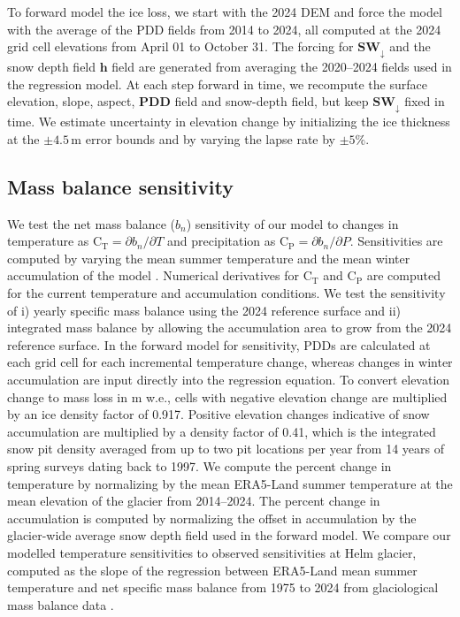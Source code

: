 \documentclass[annals,review,oneside]{igs}
\begin{document}
To forward model the ice loss, we start with the 2024 DEM and force the model with the average of the PDD fields from 2014 to 2024, all computed at the 2024 grid cell elevations from April 01 to October 31. The forcing for $\mathbf{SW_{\downarrow}}$ and the snow depth field $\mathbf{h}$ field are generated from averaging the 2020--2024 fields used in the regression model. At each step forward in time, we recompute the surface elevation, slope, aspect, $\mathbf{PDD}$ field and snow-depth field, but keep $\mathbf{SW_{\downarrow}}$ fixed in time. We estimate uncertainty in elevation change by initializing the ice thickness at the $\pm 4.5$\,m error bounds and by varying the lapse rate by $\pm 5\%$. 

\subsection{Mass balance sensitivity}
We test the net mass balance ($b_n$) sensitivity of our model to changes in temperature as $\mathrm{C_T} = \partial b_n/ \partial T$ and precipitation as $\mathrm{C_P} = \partial b_n/ \partial P$. Sensitivities are computed by varying the mean summer temperature and the mean winter accumulation of the model \citep[e.g.][]{Cuffey2010}. Numerical derivatives for $\mathrm{C_T}$ and $\mathrm{C_P}$ are computed for the current temperature and accumulation conditions. We test the sensitivity of i) yearly specific mass balance using the 2024 reference surface \citep[e.g.][]{Elsberg2001} and ii) integrated mass balance by allowing the accumulation area to grow from the 2024 reference surface. In the forward model for sensitivity, PDDs are calculated at each grid cell for each incremental temperature change, whereas changes in winter accumulation are input directly into the regression equation. To convert elevation change to mass loss in m w.e., cells with negative elevation change are multiplied by an ice density factor of 0.917. Positive elevation changes indicative of snow accumulation are multiplied by a density factor of 0.41, which is the integrated snow pit density averaged from up to two pit locations per year from 14 years of spring surveys dating back to 1997. We compute the percent change in temperature by normalizing by the mean ERA5-Land summer temperature at the mean elevation of the glacier from 2014--2024. The percent change in accumulation is computed by normalizing the offset in accumulation by the glacier-wide average snow depth field used in the forward model. We compare our modelled temperature sensitivities to observed sensitivities at Helm glacier, computed as the slope of the regression between ERA5-Land mean summer temperature and net specific mass balance from 1975 to 2024 from glaciological mass balance data \citep{WGMS2024}.
\end{document}
